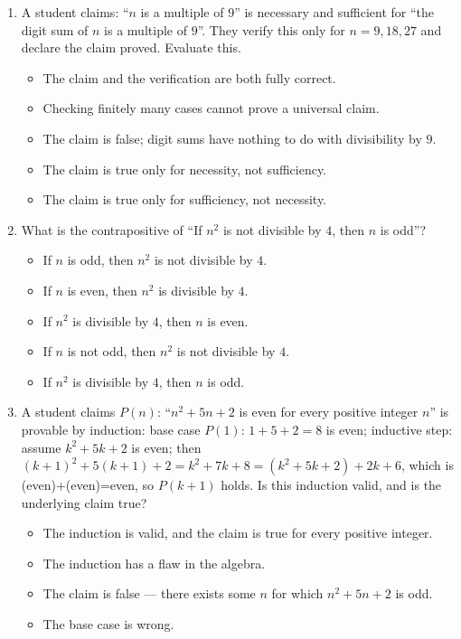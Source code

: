 \documentclass[11pt,a4paper]{article}
\begin{document}
\begin{enumerate}
\item A student claims: ``$n$ is a multiple of $9$'' is necessary and sufficient for ``the digit sum of $n$ is a multiple of $9$''. They verify this only for $n=9,18,27$ and declare the claim proved. Evaluate this.
\begin{itemize}
\item[A)] The claim and the verification are both fully correct.
\item[B)] Checking finitely many cases cannot prove a universal claim.
\item[C)] The claim is false; digit sums have nothing to do with divisibility by $9$.
\item[D)] The claim is true only for necessity, not sufficiency.
\item[E)] The claim is true only for sufficiency, not necessity.
\end{itemize}

\item What is the contrapositive of ``If $n^2$ is not divisible by $4$, then $n$ is odd''?
\begin{itemize}
\item[A)] If $n$ is odd, then $n^2$ is not divisible by $4$.
\item[B)] If $n$ is even, then $n^2$ is divisible by $4$.
\item[C)] If $n^2$ is divisible by $4$, then $n$ is even.
\item[D)] If $n$ is not odd, then $n^2$ is not divisible by $4$.
\item[E)] If $n^2$ is divisible by $4$, then $n$ is odd.
\end{itemize}

\item A student claims $P(n)$: ``$n^2+5n+2$ is even for every positive integer $n$'' is provable by induction: base case $P(1)$: $1+5+2=8$ is even; inductive step: assume $k^2+5k+2$ is even; then $(k+1)^2+5(k+1)+2=k^2+7k+8=(k^2+5k+2)+2k+6$, which is (even)+(even)=even, so $P(k+1)$ holds. Is this induction valid, and is the underlying claim true?
\begin{itemize}
\item[A)] The induction is valid, and the claim is true for every positive integer.
\item[B)] The induction has a flaw in the algebra.
\item[C)] The claim is false --- there exists some $n$ for which $n^2+5n+2$ is odd.
\item[D)] The base case is wrong.
\end{itemize}


\end{enumerate}
\end{document}
